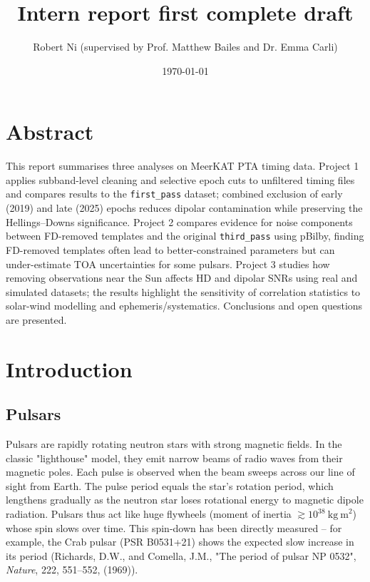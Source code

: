 \documentclass[12pt,a4paper]{article}
\title{Intern report first complete draft}
\author{Robert Ni (supervised by Prof. Matthew Bailes and Dr. Emma Carli)}
\date{\today}
\begin{document}
\maketitle
\thispagestyle{empty}

\tableofcontents
\newpage

\section*{Abstract}

This report summarises three analyses on MeerKAT PTA timing data. Project 1 applies subband-level cleaning and selective epoch cuts to unfiltered timing files and compares results to the \texttt{first\_pass} dataset; combined exclusion of early (2019) and late (2025) epochs reduces dipolar contamination while preserving the Hellings--Downs significance. Project 2 compares evidence for noise components between FD-removed templates and the original \texttt{third\_pass} using pBilby, finding FD-removed templates often lead to better-constrained parameters but can under-estimate TOA uncertainties for some pulsars. Project 3 studies how removing observations near the Sun affects HD and dipolar SNRs using real and simulated datasets; the results highlight the sensitivity of correlation statistics to solar-wind modelling and ephemeris/systematics. Conclusions and open questions are presented.

\newpage

\section{Introduction}

\subsection{Pulsars}

Pulsars are rapidly rotating neutron stars with strong magnetic fields. In the classic "lighthouse" model, they emit narrow beams of radio waves from their magnetic poles. Each pulse is observed when the beam sweeps across our line of sight from Earth. The pulse period equals the star's rotation period, which lengthens gradually as the neutron star loses rotational energy to magnetic dipole radiation. Pulsars thus act like huge flywheels (moment of inertia $\gtrsim 10^{38}\ \mathrm{kg\ m}^2$) whose spin slows over time. This spin-down has been directly measured -- for example, the Crab pulsar (PSR B0531+21) shows the expected slow increase in its period (Richards, D.W., and Comella, J.M., "The period of pulsar NP 0532", \textit{Nature}, 222, 551--552, (1969)).
\end{document}
